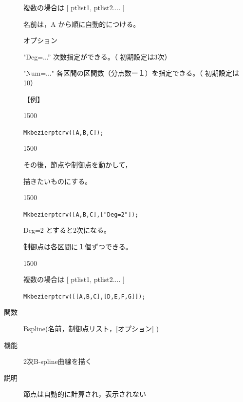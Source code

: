 \documentclass[papersize,a4paper,12pt,uplatex]{jsarticle}
\begin{document}
\begin{description}
複数の場合は  [ ptlist1, ptlist2.... ]

名前は，A から順に自動的につける。

オプション

"Deg=...”  次数指定ができる。（ 初期設定は3次）

"Num=..."  各区間の区間数（分点数ー１）を指定できる。（ 初期設定は10）

\vspace{5mm}

【例】

\begin{layer}{150}{0}
\end{layer}

\verb|Mkbezierptcrv([A,B,C]);|

\vspace{25mm}

\begin{layer}{150}{0}
\end{layer}

その後，節点や制御点を動かして，

描きたいものにする。

\vspace{30mm}

\begin{layer}{150}{0}
\end{layer}

\verb|Mkbezierptcrv([A,B,C],["Deg=2"]);|

Deg=2 とすると2次になる。

制御点は各区間に１個ずつできる。

\vspace{20mm}

\begin{layer}{150}{0}
\end{layer}

複数の場合は  [ ptlist1, ptlist2.... ]

\verb|Mkbezierptcrv([[A,B,C],[D,E,F,G]]);|

\vspace{40mm}

 \vspace{\baselineskip}
\hypertarget{bspline}{}
\item[関数]  Bspline(名前，制御点リスト，[オプション] )
\item[機能]  2次B-spline曲線を描く
\item[説明]  節点は自動的に計算され，表示されない


\end{description}
\end{document}
